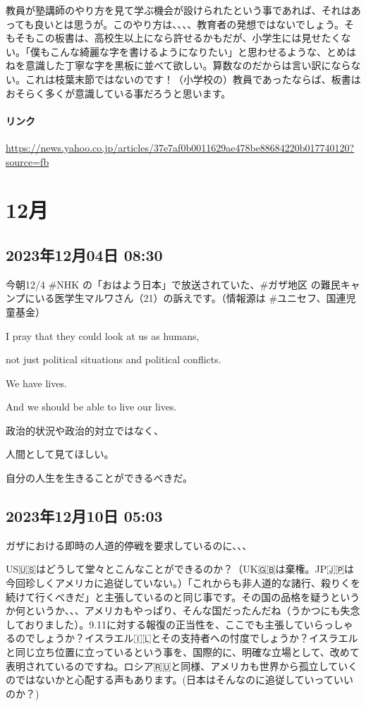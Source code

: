 教員が塾講師のやり方を見て学ぶ機会が設けられたという事であれば、それはあっても良いとは思うが。このやり方は、、、、教育者の発想ではないでしょう。そもそもこの板書は、高校生以上になら許せるかもだが、小学生には見せたくない。「僕もこんな綺麗な字を書けるようになりたい」と思わせるような、とめはねを意識した丁寧な字を黒板に並べて欲しい。算数なのだからは言い訳にならない。これは枝葉末節ではないのです！（小学校の）教員であったならば、板書はおそらく多くが意識している事だろうと思います。

\paragraph{リンク}
\url{https://news.yahoo.co.jp/articles/37e7af0b0011629ae478be88684220b017740120?source=fb}

\section{12月}

\subsection*{2023年12月04日 08:30}

今朝12/4 \#NHK の「おはよう日本」で放送されていた、\#ガザ地区 の難民キャンプにいる医学生マルワさん（21）の訴えです。（情報源は \#ユニセフ、国連児童基金）

I pray that they could look at us as humans,

not just political situations and political conflicts.

We have lives.

And we should be able to live our lives.

政治的状況や政治的対立ではなく、

人間として見てほしい。

自分の人生を生きることができるべきだ。

\subsection*{2023年12月10日 05:03}

ガザにおける即時の人道的停戦を要求しているのに、、、

US🇺🇸はどうして堂々とこんなことができるのか？（UK🇬🇧は棄権。JP🇯🇵は今回珍しくアメリカに追従していない。）「これからも非人道的な諸行、殺りくを続けて行くべきだ」と主張しているのと同じ事です。その国の品格を疑うというか何というか、、、アメリカもやっぱり、そんな国だったんだね（うかつにも失念しておりました）。9.11に対する報復の正当性を、ここでも主張していらっしゃるのでしょうか？イスラエル🇮🇱とその支持者への忖度でしょうか？イスラエルと同じ立ち位置に立っているという事を、国際的に、明確な立場として、改めて表明されているのですね。ロシア🇷🇺と同様、アメリカも世界から孤立していくのではないかと心配する声もあります。(日本はそんなのに追従していっていいのか？)

